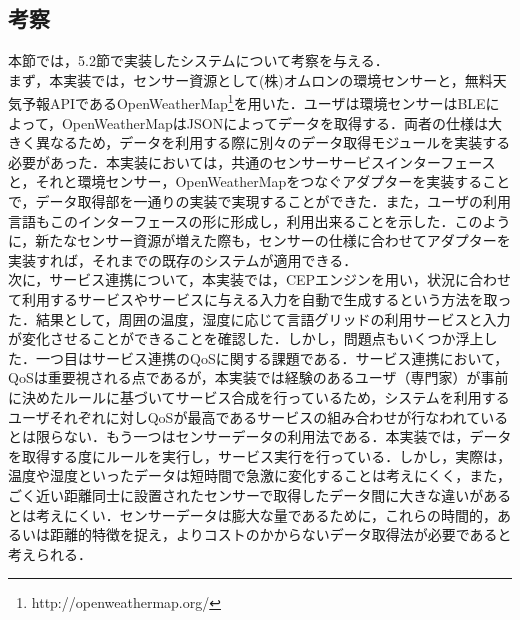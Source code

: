 \documentclass{kuisthesis}			%
\begin{document}
\subsection{考察}
本節では，5.2節で実装したシステムについて考察を与える．\\
まず，本実装では，センサー資源として(株)オムロンの環境センサーと，無料天気予報APIであるOpenWeatherMap\footnote{http://openweathermap.org/}を用いた．ユーザは環境センサーはBLEによって，OpenWeatherMapはJSONによってデータを取得する．両者の仕様は大きく異なるため，データを利用する際に別々のデータ取得モジュールを実装する必要があった．本実装においては，共通のセンサーサービスインターフェースと，それと環境センサー，OpenWeatherMapをつなぐアダプターを実装することで，データ取得部を一通りの実装で実現することができた．また，ユーザの利用言語もこのインターフェースの形に形成し，利用出来ることを示した．このように，新たなセンサー資源が増えた際も，センサーの仕様に合わせてアダプターを実装すれば，それまでの既存のシステムが適用できる．\\
次に，サービス連携について，本実装では，CEPエンジンを用い，状況に合わせて利用するサービスやサービスに与える入力を自動で生成するという方法を取った．結果として，周囲の温度，湿度に応じて言語グリッドの利用サービスと入力が変化させることができることを確認した．しかし，問題点もいくつか浮上した．一つ目はサービス連携のQoSに関する課題である．サービス連携において，QoSは重要視される点であるが，本実装では経験のあるユーザ（専門家）が事前に決めたルールに基づいてサービス合成を行っているため，システムを利用するユーザそれぞれに対しQoSが最高であるサービスの組み合わせが行なわれているとは限らない．もう一つはセンサーデータの利用法である．本実装では，データを取得する度にルールを実行し，サービス実行を行っている．しかし，実際は，温度や湿度といったデータは短時間で急激に変化することは考えにくく，また，ごく近い距離同士に設置されたセンサーで取得したデータ間に大きな違いがあるとは考えにくい．センサーデータは膨大な量であるために，これらの時間的，あるいは距離的特徴を捉え，よりコストのかからないデータ取得法が必要であると考えられる．
\end{document}
